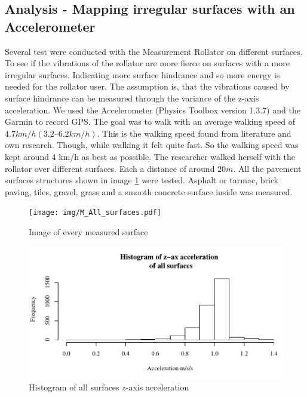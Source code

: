 \subsection{Analysis - Mapping irregular surfaces with an Accelerometer}
Several test were conducted with the Measurement Rollator on different surfaces. To see if the vibrations of the rollator are more fierce on surfaces with a more irregular surfaces. Indicating more surface hindrance and so more energy is needed for the rollator user. The assumption is, that the vibrations caused by surface hindrance can be measured through the variance of the z-axis acceleration. We used the Accelerometer (Physics Toolbox version 1.3.7) and the Garmin to record GPS. The goal was to walk with an average walking speed of $4.7 km/h (3.2 – 6.2 km/h)$. This is the walking speed found from literature and own research. Though, while walking it felt quite fast. So the walking speed was kept around 4 km/h as best as possible. The researcher walked herself with the rollator over different surfaces. Each a distance of around $20m$. All the pavement surfaces structures shown in image \ref{surfaceimg} were tested. Asphalt or tarmac, brick paving, tiles, gravel, grass and a smooth concrete surface inside was measured. 

\begin{figure}[p]
\texttt{[image: img/M\_All\_surfaces.pdf]}
\centering
\caption{Image of every measured surface \label{surfaceimg}}
\end{figure}

\begin{figure}[p]
\includegraphics[width=\textwidth]{img/M_Histogram_all_surf.pdf}
\centering
\caption{Histogram of all surfaces $z$-axis acceleration \label{hist}}
\end{figure}



